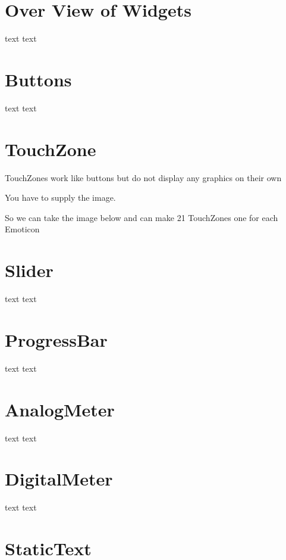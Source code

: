 \hypertarget{d0/d90/intro_widgets_overView}{}\section{Over View of Widgets}\label{d0/d90/intro_widgets_overView}
text text\par
 \hypertarget{d0/d90/intro_widgets_buttons}{}\section{Buttons}\label{d0/d90/intro_widgets_buttons}
text text\par
 

 \hypertarget{d0/d90/intro_widgets_touchZone}{}\section{Touch\-Zone}\label{d0/d90/intro_widgets_touchZone}
Touch\-Zones work like buttons but do not display any graphics on their own\par
 You have to supply the image.\par
 So we can take the image below and can make 21 Touch\-Zones one for each Emoticon\par
  \hypertarget{d0/d90/intro_widgets_slider}{}\section{Slider}\label{d0/d90/intro_widgets_slider}
text text\par
 \hypertarget{d0/d90/intro_widgets_progressBar}{}\section{Progress\-Bar}\label{d0/d90/intro_widgets_progressBar}
text text\par
 \hypertarget{d0/d90/intro_widgets_analogMeter}{}\section{Analog\-Meter}\label{d0/d90/intro_widgets_analogMeter}
text text\par
 \hypertarget{d0/d90/intro_widgets_digitalMeter}{}\section{Digital\-Meter}\label{d0/d90/intro_widgets_digitalMeter}
text text\par
 \hypertarget{d0/d90/intro_widgets_staticText}{}\section{Static\-Text}\label{d0/d90/intro_widgets_staticText}
